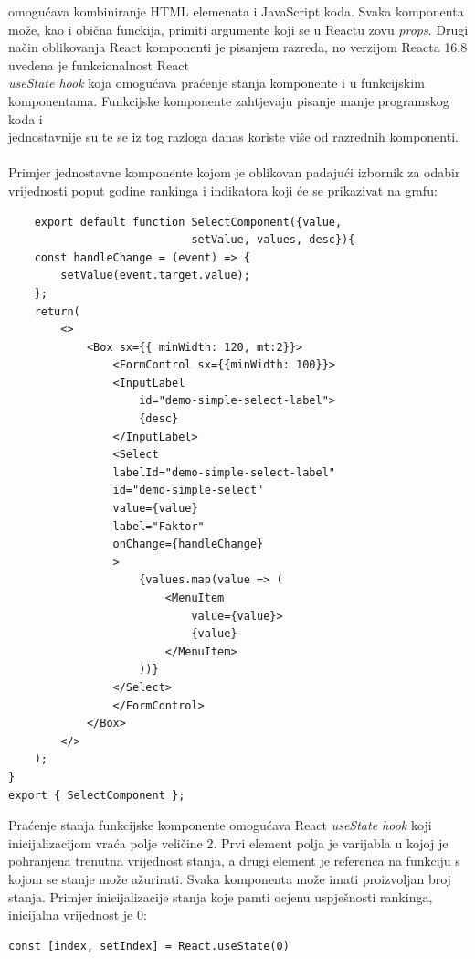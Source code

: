 \documentclass[times, utf8, zavrsni]{fer}
\begin{document}
omogućava kombiniranje HTML elemenata i JavaScript koda. Svaka komponenta može, kao i obična funckija, primiti argumente koji se u Reactu zovu \emph{props}.
Drugi način oblikovanja React komponenti je pisanjem razreda, no verzijom Reacta 16.8 uvedena je funkcionalnost React \\\emph{useState hook} koja omogućava 
praćenje stanja komponente i u funkcijskim komponentama. Funkcijske komponente zahtjevaju pisanje manje programskog koda i \\jednostavnije su te se iz tog
razloga danas koriste više od razrednih komponenti. 
\\\\Primjer jednostavne komponente kojom je oblikovan padajući izbornik za odabir \\vrijednosti poput godine rankinga i indikatora koji će se prikazivat na grafu:
\begin{verbatim}
    export default function SelectComponent({value, 
                            setValue, values, desc}){
    const handleChange = (event) => {
        setValue(event.target.value);
    };
    return(
        <>
            <Box sx={{ minWidth: 120, mt:2}}>
                <FormControl sx={{minWidth: 100}}>
                <InputLabel 
                    id="demo-simple-select-label">
                    {desc}
                </InputLabel>
                <Select
                labelId="demo-simple-select-label"
                id="demo-simple-select"
                value={value}
                label="Faktor"
                onChange={handleChange}
                >
                    {values.map(value => (
                        <MenuItem 
                            value={value}>
                            {value}
                        </MenuItem>
                    ))}
                </Select>
                </FormControl>
            </Box>
        </>
    );
}
export { SelectComponent };
\end{verbatim}
Praćenje stanja funkcijske komponente omogućava React \emph{useState hook} koji \\inicijalizacijom vraća polje veličine 2. Prvi element polja je varijabla u kojoj 
je pohranjena trenutna vrijednost stanja, a drugi element je referenca na funkciju s kojom se stanje može ažurirati. Svaka komponenta može imati 
proizvoljan broj stanja. Primjer inicijalizacije stanja koje pamti ocjenu uspješnosti rankinga, inicijalna vrijednost je 0:
\begin{verbatim}
const [index, setIndex] = React.useState(0)
\end{verbatim}
\end{document}
